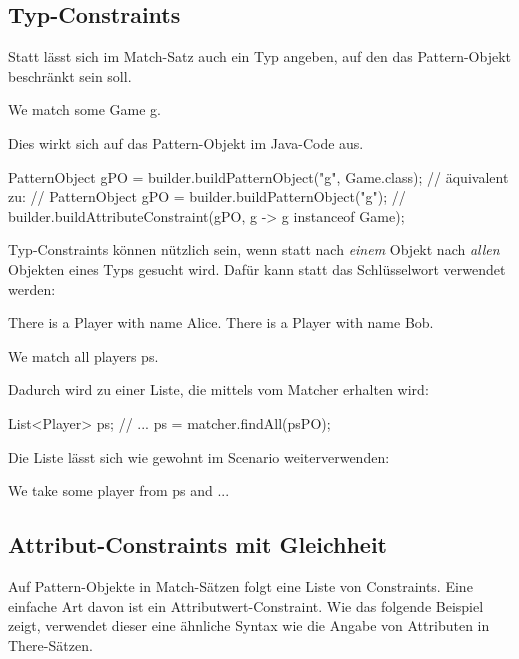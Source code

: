 \subsection{Typ-Constraints}

Statt  lässt sich im Match-Satz auch ein Typ angeben, auf den das Pattern-Objekt beschränkt sein soll.

\begin{mdcodeblock}
    We match some Game g.
\end{mdcodeblock}

Dies wirkt sich auf das Pattern-Objekt im Java-Code aus.

\begin{jcodeblock}
    PatternObject gPO = builder.buildPatternObject("g", Game.class);
    // äquivalent zu:
    // PatternObject gPO = builder.buildPatternObject("g");
    // builder.buildAttributeConstraint(gPO, g -> g instanceof Game);
\end{jcodeblock}

Typ-Constraints können nützlich sein, wenn statt nach \emph{einem} Objekt nach \emph{allen} Objekten eines Typs gesucht wird.
Dafür kann statt  das Schlüsselwort  verwendet werden:

\begin{mdcodeblock}
    There is a Player with name Alice.
    There is a Player with name Bob.

    We match all players ps.
\end{mdcodeblock}

Dadurch wird  zu einer Liste, die mittels  vom Matcher erhalten wird:

\begin{jcodeblock}
    List<Player> ps;
    {
        // ...
        ps = matcher.findAll(psPO);
    }
\end{jcodeblock}

Die Liste lässt sich wie gewohnt im Scenario weiterverwenden:

\begin{mdcodeblock}
    We take some player from ps and ...
\end{mdcodeblock}

\subsection{Attribut-Constraints mit Gleichheit}

Auf Pattern-Objekte in Match-Sätzen folgt eine Liste von Constraints.
Eine einfache Art davon ist ein Attributwert-Constraint.
Wie das folgende Beispiel zeigt, verwendet dieser eine ähnliche Syntax wie die Angabe von Attributen in There-Sätzen.

